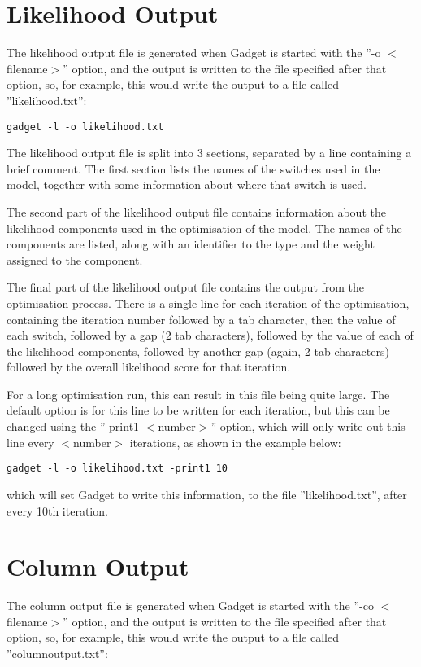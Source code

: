 \documentclass [a4paper, 10pt]{book}
\begin{document}
\section{Likelihood Output}\label{sec:likelihoodoutput}
The likelihood output file is generated when Gadget is started with the ''-o $<$filename$>$'' option, and the output is written to the file specified after that option, so, for example, this would write the output to a file called ''likelihood.txt'':

{\small\begin{verbatim}
gadget -l -o likelihood.txt
\end{verbatim}}

The likelihood output file is split into 3 sections, separated by a line containing a brief comment.  The first section lists the names of the switches used in the model, together with some information about where that switch is used.

\bigskip
The second part of the likelihood output file contains information about the likelihood components used in the optimisation of the model.  The names of the components are listed, along with an identifier to the type and the weight assigned to the component.

\bigskip
The final part of the likelihood output file contains the output from the optimisation process.  There is a single line for each iteration of the optimisation, containing the iteration number followed by a tab character, then the value of each switch, followed by a gap (2 tab characters), followed by the value of each of the likelihood components, followed by another gap (again, 2 tab characters) followed by the overall likelihood score for that iteration.

\bigskip
For a long optimisation run, this can result in this file being quite large.  The default option is for this line to be written for each iteration, but this can be changed using the ''-print1 $<$number$>$'' option, which will only write out this line every $<$number$>$ iterations, as shown in the example below:

{\small\begin{verbatim}
gadget -l -o likelihood.txt -print1 10
\end{verbatim}}

which will set Gadget to write this information, to the file ''likelihood.txt'', after every 10th iteration.

\section{Column Output}\label{sec:columnoutput}
The column output file is generated when Gadget is started with the ''-co $<$filename$>$'' option, and the output is written to the file specified after that option, so, for example, this would write the output to a file called ''columnoutput.txt'':
\end{document}
